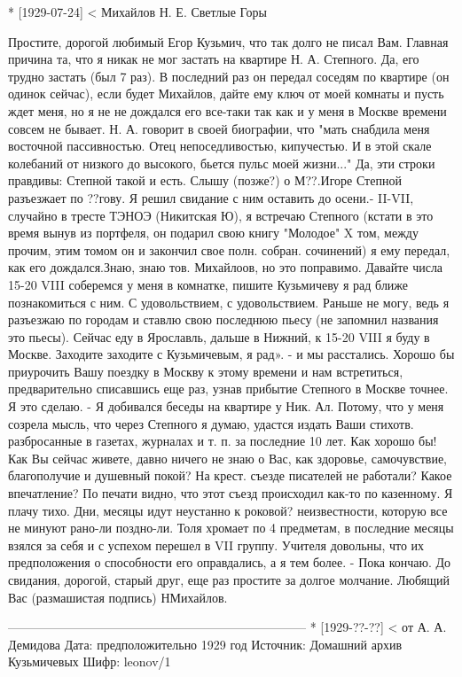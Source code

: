 * [1929-07-24] < Михайлов Н. Е.
Светлые Горы

Простите, дорогой любимый Егор Кузьмич, что так долго не писал Вам. Главная причина та, что я никак не мог застать на квартире Н. А. Степного.
Да, его трудно застать (был 7 раз). В последний раз он передал соседям по квартире (он одинок сейчас), если будет Михайлов, дайте ему ключ от моей комнаты и пусть ждет меня, но я не не дождался его все-таки так как и у меня в Москве времени совсем не бывает. Н. А. говорит в своей биографии, что "мать снабдила меня восточной пассивностью. Отец непоседливостью, кипучестью. И в этой скале колебаний от низкого до высокого, бьется пульс моей жизни..."
Да, эти строки правдивы: Степной такой и есть.
Слышу (позже?) о М??.Игоре Степной разъезжает по ??гову. Я решил свидание с ним оставить до осени.-
II-VII, случайно в тресте ТЭНОЭ (Никитская Ю), я встречаю Степного (кстати в это время вынув из портфеля, он подарил свою книгу "Молодое" X том, между прочим, этим томом он и закончил свое полн. собран. сочинений) я ему передал, как его дождался.Знаю, знаю тов. Михайлоов, но это поправимо.
Давайте числа 15-20 VIII соберемся у меня в комнатке, пишите Кузьмичеву я рад ближе познакомиться с ним.
С удовольствием, с удовольствием. Раньше не могу, ведь я разъезжаю по городам и ставлю свою последнюю пьесу (не запомнил названия это пьесы). Сейчас еду в Ярославль, дальше в Нижний, к 15-20 VIII я буду в Москве. Заходите заходите с Кузьмичевым, я рад». - и мы расстались.
Хорошо бы приурочить Вашу поездку в Москву к этому времени и нам встретиться, предварительно списавшись еще раз, узнав прибытие Степного в Москве точнее.  Я это сделаю. - Я добивался беседы на квартире у Ник. Ал. Потому, что у меня созрела мысль, что через Степного я думаю, удастся издать Ваши стихотв. разбросанные в газетах, журналах и т. п. за последние 10 лет. 
Как хорошо бы!
Как Вы сейчас живете, давно ничего не знаю о Вас, как здоровье, самочувствие, благополучие и душевный покой?
На крест. съезде писателей не работали? Какое впечатление? По печати видно, что этот съезд происходил как-то по казенному. Я плачу тихо. Дни, месяцы идут неустанно к роковой? неизвестности, которую все не минуют рано-ли поздно-ли.
Толя хромает по 4 предметам, в последние месяцы взялся за себя и с успехом перешел в VII группу. Учителя довольны, что их предположения о способности его оправдались, а я тем более. -  Пока кончаю.
До свидания, дорогой, старый друг, еще раз простите за долгое молчание.
Любящий Вас  (размашистая подпись) НМихайлов.

------------------------------------------------------------------------
* [1929-??-??] < от А. А. Демидова
Дата: предположительно 1929 год
Источник: Домашний архив Кузьмичевых
Шифр: leonov/1

